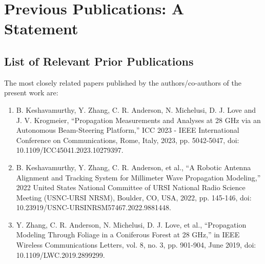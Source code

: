 \documentclass[12pt, draftcls, onecolumn]{IEEEtran}
\begin{document}

\maketitle
\thispagestyle{plain}
\pagestyle{plain}
\vspace{-18mm}

\section*{Previous Publications: A Statement}

\subsection{List of Relevant Prior Publications}
The most closely related papers published by the authors/co-authors of the present work are:
\begin{enumerate}
    \item B. Keshavamurthy, Y. Zhang, C. R. Anderson, N. Michelusi, D. J. Love and J. V. Krogmeier, ``Propagation Measurements and Analyses at 28 GHz via an Autonomous Beam-Steering Platform,'' ICC 2023 - IEEE International Conference on Communications, Rome, Italy, 2023, pp. 5042-5047, doi: 10.1109/ICC45041.2023.10279397.\label{1}
    \item B. Keshavamurthy, Y. Zhang, C. R. Anderson, et al., ``A Robotic Antenna Alignment and Tracking System for Millimeter Wave Propagation Modeling,'' 2022 United States National Committee of URSI National Radio Science Meeting (USNC-URSI NRSM), Boulder, CO, USA, 2022, pp. 145-146, doi: 10.23919/USNC-URSINRSM57467.2022.9881448.\label{2}
    \item Y. Zhang, C. R. Anderson, N. Michelusi, D. J. Love, et al., ``Propagation Modeling Through Foliage in a Coniferous Forest at 28 GHz,'' in IEEE Wireless Communications Letters, vol. 8, no. 3, pp. 901-904, June 2019, doi: 10.1109/LWC.2019.2899299.\label{3}
\end{enumerate}
\end{document}
